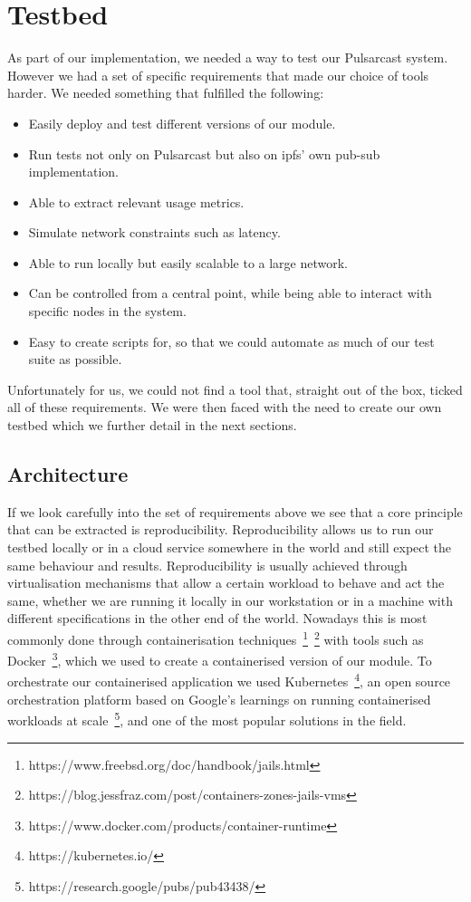 \section{Testbed}\label{sec:testbed}

As part of our implementation, we needed a way to test our Pulsarcast system.
However we had a set of specific requirements that made our choice of tools
harder. We needed something that fulfilled the following:

\begin{itemize}
  \item Easily deploy and test different versions of our module.
  \item Run tests not only on Pulsarcast but also on \acrshort{ipfs}' own pub-sub
    implementation.
  \item Able to extract relevant usage metrics.
  \item Simulate network constraints such as latency.
  \item Able to run locally but easily scalable to a large network.
  \item Can be controlled from a central point, while being able to interact
    with specific nodes in the system.
  \item Easy to create scripts for, so that we could automate as much of our
    test suite as possible.
\end{itemize}

Unfortunately for us, we could not find a tool that, straight out of the box,
ticked all of these requirements. We were then faced with the need to create
our own testbed which we further detail in the next sections.

\subsection{Architecture}\label{subsec:testbed-architecture}

If we look carefully into the set of
requirements above we see that a core principle that can be extracted is
reproducibility. Reproducibility allows us to run our testbed locally or in a
cloud service somewhere in the world and still expect the same behaviour and
results. Reproducibility is usually achieved through virtualisation mechanisms
that allow a certain workload to behave and act the same, whether we are
running it locally in our workstation or in a machine with different
specifications in the other end of the world. Nowadays this is most commonly
done through containerisation
techniques~\footnote{https://www.freebsd.org/doc/handbook/jails.html}~\footnote{https://blog.jessfraz.com/post/containers-zones-jails-vms}
with tools such as
Docker~\footnote{https://www.docker.com/products/container-runtime}, which we
used to create a containerised version of our module. To orchestrate our
containerised application we used Kubernetes~\footnote{https://kubernetes.io/},
an open source orchestration platform based on Google's learnings on running
containerised workloads at
scale~\footnote{https://research.google/pubs/pub43438/}, and one of the most
popular solutions in the field.

